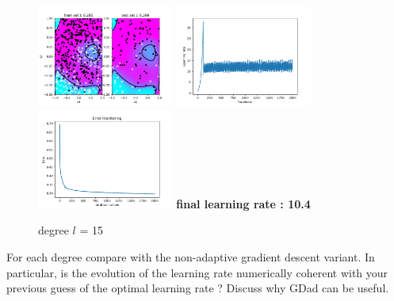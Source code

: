 \documentclass[a4paper]{article}
\begin{document}
\begin{figure}[h]	
	\includegraphics[width=0.4\textwidth]{logreg_deg15_iter2000.png}
	\includegraphics[width=0.4\textwidth]{logreg_deg15_iter2000_learn.png}
	\includegraphics[width=0.4\textwidth]{logreg_deg15_iter2000_error.png}
	\textbf{final learning rate : 10.4}
	\caption{degree $l$ = 15}
\end{figure}

For each degree compare with the non-adaptive gradient descent variant. In particular, is the evolution of the learning rate numerically coherent with your previous guess of the optimal learning rate ? Discuss why GDad can be useful.
\end{document}
